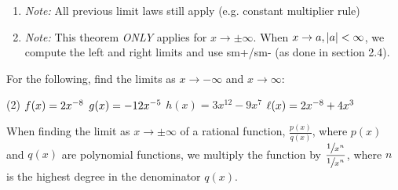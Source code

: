 \documentclass[mathNotesPreamble]{subfiles}
\begin{document}
      \begin{center}
      \end{center}
      \begin{enumerate}[label=]
        \item \textit{Note:} All previous limit laws still apply (e.g. constant multiplier rule)
        \item \textit{Note:} This theorem \textit{ONLY} applies for $x\to\pm\infty$. When $x\to a, \abs{a}<\infty$, we compute the left and right limits and use sm+/sm- (as done in section 2.4).
      \end{enumerate}
      \begin{ex*}
        For the following, find the limits as $x\to-\infty$ and $x\to \infty$:
        \begin{tasks}[after-item-skip=\stretch{1}](2)
          \task[] $f(x)=2x\inv[8]$
          \task[] $g(x)=-12x\inv[5]$
          \task[] $h(x)=3x^{12}-9x^7$
          \task[] $\ell(x)=2x\inv[8]+4x^3$
        \end{tasks}
      \end{ex*}
      \pagebreak 
      
      When finding the limit as $x\to\pm\infty$ of a rational function, $\frac{p(x)}{q(x)}$, where $p(x)$ and $q(x)$ are polynomial functions, we multiply the function by $\dfrac{\sfrac{1}{x^n}}{\sfrac{1}{x^n}}$, where $n$ is the highest degree in the denominator $q(x)$.
      
\end{document}
